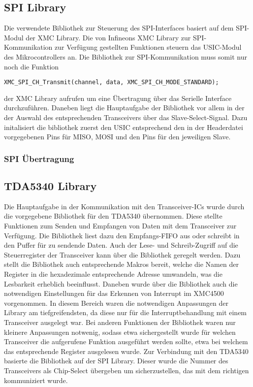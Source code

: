 \subsection{SPI Library}
Die verwendete Bibliothek zur Steuerung des \ac{SPI}-Interfaces basiert auf dem \ac{SPI}-Modul der XMC Library. Die von Infineons XMC Library zur \ac{SPI}-Kommunikation zur Verfügung gestellten Funktionen steuern das \ac{USIC}-Modul des Mikrocontrollers an. Die Bibliothek zur \ac{SPI}-Kommunikation muss somit nur noch die Funktion
\begin{lstlisting}
XMC_SPI_CH_Transmit(channel, data, XMC_SPI_CH_MODE_STANDARD);
\end{lstlisting} der XMC Library aufrufen um eine Übertragung über das Serielle Interface durchzuführen. Daneben liegt die Hauptaufgabe der Bibliothek vor allem in der der Auswahl des entsprechenden Transceivers über das Slave-Select-Signal. Dazu initalisiert die bibliothek zuerst den \ac{USIC} entsprechend den in der Headerdatei vorgegebenen Pins für MISO, MOSI und den Pins für den jeweiligen Slave.

\subsubsection{SPI Übertragung}

\subsection{TDA5340 Library}
Die Hauptaufgabe in der Kommunikation mit den Transceiver-\acp{IC} wurde durch die vorgegebene Bibliothek für den TDA5340 übernommen. Diese stellte Funktionen zum Senden und Empfangen von Daten mit dem Transceiver zur Verfügung. Die Bibliothek liest dazu den Empfangs-\ac{FIFO} aus oder schreibt in den Puffer für zu sendende Daten. Auch der Lese- und Schreib-Zugriff auf die Steuerregister der Transceiver kann über die Bibliothek geregelt werden. Dazu stellt die Bibliothek auch entsprechende Makros bereit, welche die Namen der Register in die hexadezimale entsprechende Adresse umwandeln, was die Lesbarkeit erheblich beeinflusst. Daneben wurde über die Bibliothek auch die notwendigen  Einstellungen für das Erkennen von Interrupt im XMC4500 vorgenommen. In diesem Bereich waren die notwendigen Anpassungen der Library am tiefgreifendsten, da diese nur für die Interruptbehandlung mit einem Transceiver ausgelegt war. Bei anderen Funktionen der Bibliothek waren nur kleinere Anpassungen notwenig, sodass etwa sichergestellt wurde für welchen Transceiver die aufgerufene Funktion ausgeführt werden sollte, etwa bei welchem das entsprechende Register ausgelesen wurde.
Zur Verbindung mit den TDA5340 basierte die Bibliothek auf der SPI Library. Dieser wurde die Nummer des Transceivers als Chip-Select übergeben um sicherzustellen, das mit dem richtigen kommuniziert wurde.

